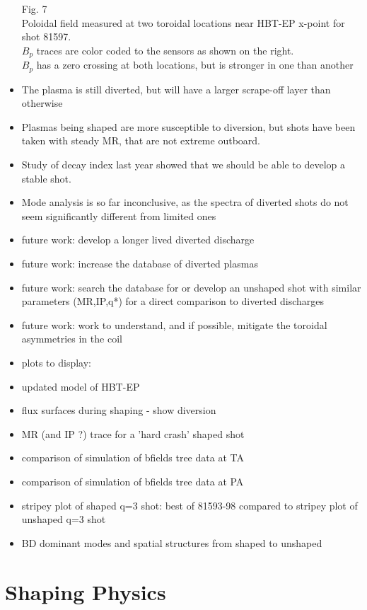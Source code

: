 \documentclass{article}
\begin{document}
\begin{multicols}{5}
\begin{itemize}
\begin{center}
Fig. 7\\
Poloidal field measured at two toroidal locations near HBT-EP x-point for shot 81597.\\
$B_p$ traces are color coded to the sensors as shown on the right.\\
$B_p$ has a zero crossing at both locations, but is stronger in one than another\\
\end{center}
\item The plasma is still diverted, but will have a larger scrape-off layer than otherwise
\item Plasmas being shaped are more susceptible to diversion, but shots have been taken with steady MR, that are not extreme outboard.
\item Study of decay index last year showed that we should be able to develop a stable shot.
\item Mode analysis is so far inconclusive, as the spectra of diverted shots do not seem significantly different from limited ones
\item future work: develop a longer lived diverted discharge
\item future work: increase the database of diverted plasmas
\item future work: search the database for or develop an unshaped shot with similar parameters (MR,IP,q*) for a direct comparison to diverted discharges
\item future work: work to understand, and if possible, mitigate the toroidal asymmetries in the coil
\item plots to display:
\item updated model of HBT-EP
\item flux surfaces during shaping - show diversion
\item MR (and IP ?) trace for a 'hard crash' shaped shot
\item comparison of simulation of bfields tree data at TA
\item comparison of simulation of bfields tree data at PA
\item stripey plot of shaped q=3 shot: best of 81593-98 compared to stripey plot of unshaped q=3 shot
\item BD dominant modes and spatial structures from shaped to unshaped


\end{itemize}

\section{Shaping Physics}


\end{multicols}
\end{document}
